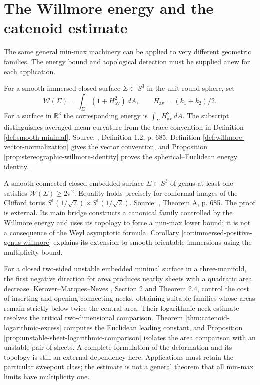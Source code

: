 \chapter{The Willmore energy and the catenoid estimate}\label{sec:willmore-catenoid}
The same general min-max machinery can be applied to very different geometric families. The energy bound and topological detection must be supplied anew for each application.

\begin{definition}\label{def:willmore-energy}
For a smooth immersed closed surface $\Sigma\subset S^3$ in the unit round sphere, set
\[
 \mathcal W(\Sigma)=\int_\Sigma(1+H_{\mathrm{av}}^2)\,dA,
 \qquad H_{\mathrm{av}}=(k_1+k_2)/2.
\]
For a surface in $\mathbb R^3$ the corresponding energy is $\int_\Sigma H_{\mathrm{av}}^2\,dA$. The subscript distinguishes averaged mean curvature from the trace convention in Definition \ref{def:smooth-minimal}. Source: \cite{MNWill}, Definition 1.2, p. 685. Definition \ref{def:willmore-vector-normalization} gives the vector convention, and Proposition \ref{prop:stereographic-willmore-identity} proves the spherical--Euclidean energy identity.
\end{definition}

\begin{theorem}\label{thm:willmore-bound}
A smooth connected closed embedded surface $\Sigma\subset S^3$ of genus at least one satisfies $\mathcal W(\Sigma)\geq2\pi^2$. Equality holds precisely for conformal images of the Clifford torus
$S^1(1/\sqrt2)\times S^1(1/\sqrt2)$.
Source: \cite{MNWill}, Theorem A, p. 685. The proof is external. Its main bridge constructs a canonical family controlled by the Willmore energy and uses its topology to force a min-max lower bound; it is not a consequence of the Weyl asymptotic formula. Corollary \ref{cor:immersed-positive-genus-willmore} explains its extension to smooth orientable immersions using the multiplicity bound.
\end{theorem}

\begin{remark}\label{rem:catenoid-estimate}
For a closed two-sided unstable embedded minimal surface in a three-manifold, the first negative direction for area produces nearby sheets with a quadratic area decrease. Ketover--Marques--Neves \cite{KMN}, Section 2 and Theorem 2.4, control the cost of inserting and opening connecting necks, obtaining suitable families whose areas remain strictly below twice the central area. Their logarithmic neck estimate resolves the critical two-dimensional comparison. Theorem \ref{thm:catenoid-logarithmic-excess} computes the Euclidean leading constant, and Proposition \ref{prop:unstable-sheet-logarithmic-comparison} isolates the area comparison with an unstable pair of sheets. A complete formulation of the deformation and its topology is still an external dependency here. Applications must retain the particular sweepout class; the estimate is not a general theorem that all min-max limits have multiplicity one.
\end{remark}

